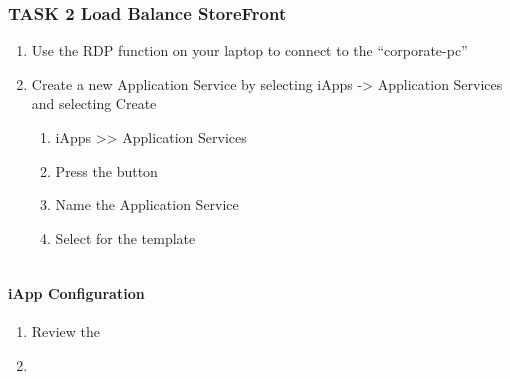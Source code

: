 \documentclass[letterpaper,10pt,english]{sphinxmanual}
\begin{document}
\subsubsection{TASK 2 \textendash{} Load Balance StoreFront}
\label{\detokenize{class2/module2/lab1:task-2-load-balance-storefront}}

\begin{enumerate}
\item {} 
Use the RDP function on your laptop to connect to the “corporate-pc”

\item {} 
Create a new Application Service by selecting iApps -\textgreater{} Application
Services and selecting Create
\begin{enumerate}
\item {} 
iApps \textgreater{}\textgreater{} Application Services

\item {} 
Press the  button

\item {} 
Name the Application Service 

\item {} 
Select  for the template

\end{enumerate}

\end{enumerate}


\begin{savenotes}\sphinxattablestart
\centering
\begin{tabulary}{\linewidth}[t]{|T|}
\hline
\\
\hline
\end{tabulary}
\par
\sphinxattableend\end{savenotes}


\paragraph{iApp Configuration}
\label{\detokenize{class2/module2/lab1:iapp-configuration}}\begin{enumerate}
\item {} 
Review the 

\item {} 

\end{enumerate}
\end{document}

